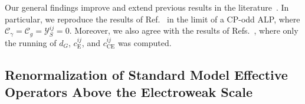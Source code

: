 Our general findings improve and extend previous results in the
literature~\cite{Marciano:2016yhf,Galda:2023qjx,DiLuzio:2020oah}.
In particular, we reproduce the results of Ref.~\cite{Galda:2023qjx} in the limit of a CP-odd
ALP, where $\mathcal C_\gamma = \mathcal C_g = \mathcal Y_S^{ij} = 0$.
Moreover, we also agree with the results of Refs.~\cite{Marciano:2016yhf,DiLuzio:2020oah},
where only the running of $d_G$, $c_{\text{E}}^{ij}$, and $c_{\text{CE}}^{ij}$ was computed.

\subsection{Renormalization of Standard Model Effective Operators Above the Electroweak Scale}
\label{sec:ALPSMEFT}

